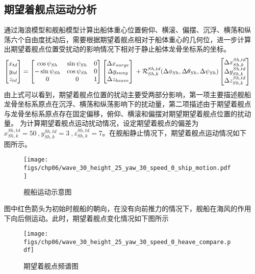 \subsection{期望着舰点运动分析}
通过海浪模型和舰船模型计算出船体重心位置俯仰、横滚、偏摆、沉浮、横荡和纵荡六个自由度扰动后，需要根据期望着舰点相对于船体重心的几何位，进一步计算出期望着舰点位置受扰动的影响情况下相对于静止船体龙骨坐标系的坐标。
\begin{equation}
\begin{bmatrix}  x_{td} \\ y_{td} \\z_{td} \end{bmatrix} = \begin{bmatrix}	\cos \psi_{Sh} & \sin \psi_{Sh}  & 0     \\	 -\sin \psi_{Sh} & \cos \psi_{Sh}   & 0 \\ 	0   & 0 & 1 \end{bmatrix} \begin{bmatrix} \Delta x_{surge} \\ \Delta y_{sway} \\ \Delta z_{heave} \end{bmatrix} \\+ \mathcal{R}_{Sh,k}^{Sh,td}(\Delta \phi_{Sh}, \Delta \theta_{Sh}, \Delta \psi_{Sh}) \begin{bmatrix} \Delta x_{Sh,k}^{Sh,td} \\ \Delta y_{Sh,k}^{Sh,td} \\ \Delta z_{Sh,k}^{Sh,td} \end{bmatrix}
\end{equation}
由上式可以看到，期望着舰点位置的扰动主要受两部分影响，第一项主要描述舰船龙骨坐标系原点在沉浮、横荡和纵荡影响下的扰动量，第二项描述由于期望着舰点与龙骨坐标系原点存在固定偏移，俯仰、横滚和偏摆对期望期望着舰点位置的扰动量。
为计算期望着舰点运动扰动情况，设定期望着舰点的偏差为$x_{Sh,k}^{Sh,td} =50\ , y_{Sh,k}^{Sh,td}= 3\ ,z_{Sh,k}^{Sh,td}=7$。在舰船静止情况下，期望着舰点运动情况如下图所示。
 \begin{figure}[!ht]
	\centering
	\texttt{[image: figs/chp06/wave\_30\_height\_25\_yaw\_30\_speed\_0\_ship\_motion.pdf]}	
	\caption{舰船运动示意图}
	\label{fig:wave_30_height_25_yaw_30_speed_0_ship_motion}
\end{figure}
图中红色箭头为初始时舰船的朝向，在没有向前推力的情况下，舰船在海风的作用下向后侧运动。此时，期望着舰点变化情况如下图所示
 \begin{figure}[!ht]
	\centering
	\texttt{[image: figs/chp06/wave\_30\_height\_25\_yaw\_30\_speed\_0\_heave\_compare.pdf]}	
	\caption{期望着舰点频谱图}
	\label{fig:wave_30_height_25_yaw_30_speed_0_heave_compare}
\end{figure}

